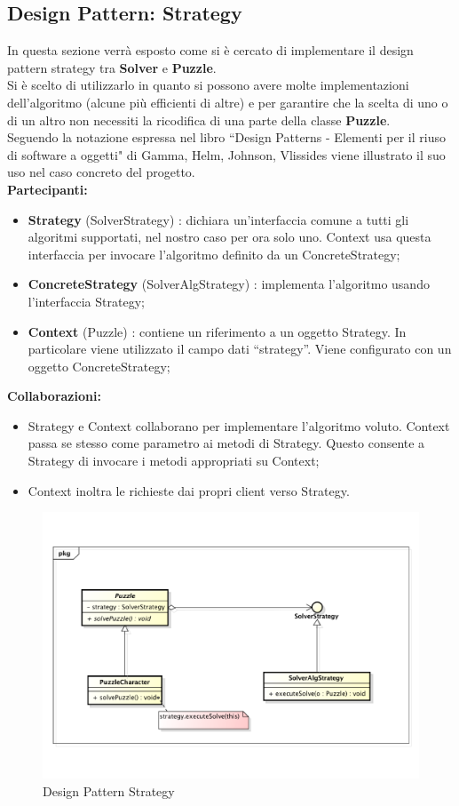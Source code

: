 	\subsection{Design Pattern: Strategy} 
	\label{DPS}
In questa sezione verrà esposto come si è cercato di implementare il design pattern strategy tra \textbf{Solver} e \textbf{Puzzle}. \\
Si è scelto di utilizzarlo in quanto si possono avere molte implementazioni dell'algoritmo (alcune più efficienti di altre) e per garantire che la scelta di uno o di un altro non necessiti la ricodifica di una parte della classe \textbf{Puzzle}. \\
Seguendo la notazione espressa nel libro ``Design Patterns - Elementi per il riuso di software a oggetti" di Gamma, Helm, Johnson, Vlissides viene illustrato il suo uso nel caso concreto del progetto. \\
\textbf{Partecipanti:}
		\begin{itemize}
			\item \textbf{Strategy} (SolverStrategy) :  dichiara un'interfaccia comune a tutti gli algoritmi supportati, nel nostro caso per ora solo uno. Context usa questa interfaccia per invocare l'algoritmo definito da un ConcreteStrategy;
			\item \textbf{ConcreteStrategy} (SolverAlgStrategy) : implementa l'algoritmo usando l'interfaccia Strategy;
			\item \textbf{Context} (Puzzle) : contiene un riferimento a un oggetto Strategy. In particolare viene utilizzato il campo dati ``strategy''. Viene configurato con un oggetto ConcreteStrategy; \\
		\end{itemize}
\noindent
\textbf{Collaborazioni:}
		\begin{itemize}
			\item Strategy e Context collaborano per implementare l'algoritmo voluto. Context passa se stesso come parametro ai metodi di Strategy. Questo consente a Strategy di invocare i metodi appropriati su Context;
			\item Context inoltra le richieste dai propri client verso Strategy.
		\end{itemize}
\noindent
	\begin{figure}[htbp]
		\centering
		\includegraphics[width=15cm]{img/DesignPatternStrategy.pdf}
		\caption{Design Pattern Strategy}
		\label{Design Pattern Strategy}
	\end{figure}


